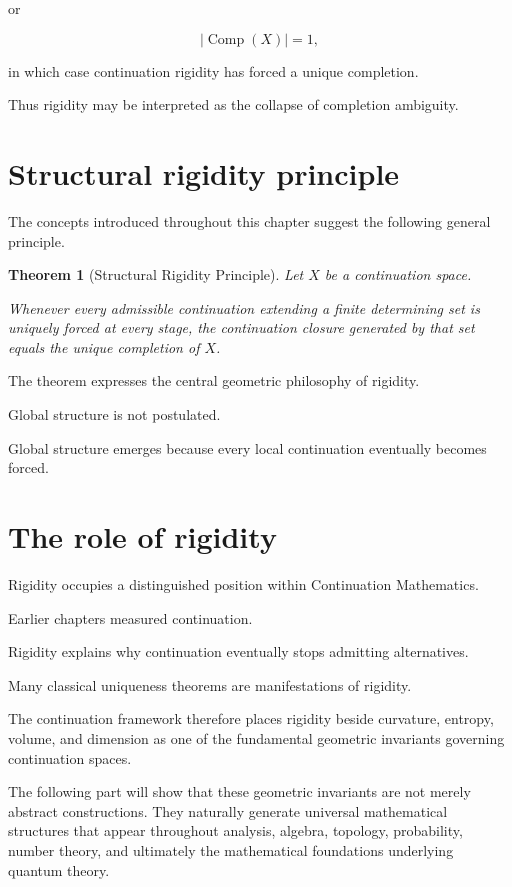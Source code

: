 \documentclass[13pt,openany]{book}
\theoremstyle{plain}
\newtheorem{theorem}{Theorem}[chapter]
\theoremstyle{definition}
\begin{document}
or

\[
|\operatorname{Comp}(X)|=1,
\]

in which case continuation rigidity has forced a unique completion.

Thus rigidity may be interpreted as the collapse of completion ambiguity.


\section{Structural rigidity principle}

The concepts introduced throughout this chapter suggest the following general principle.

\begin{theorem}[Structural Rigidity Principle]
Let $X$ be a continuation space.

Whenever every admissible continuation extending a finite determining set is uniquely forced at every stage, the continuation closure generated by that set equals the unique completion of $X$.
\end{theorem}

The theorem expresses the central geometric philosophy of rigidity.

Global structure is not postulated.

Global structure emerges because every local continuation eventually becomes forced.


\section{The role of rigidity}

Rigidity occupies a distinguished position within Continuation Mathematics.

Earlier chapters measured continuation.

Rigidity explains why continuation eventually stops admitting alternatives.

Many classical uniqueness theorems are manifestations of rigidity.

The continuation framework therefore places rigidity beside curvature, entropy, volume, and dimension as one of the fundamental geometric invariants governing continuation spaces.

The following part will show that these geometric invariants are not merely abstract constructions. They naturally generate universal mathematical structures that appear throughout analysis, algebra, topology, probability, number theory, and ultimately the mathematical foundations underlying quantum theory.
\end{document}
